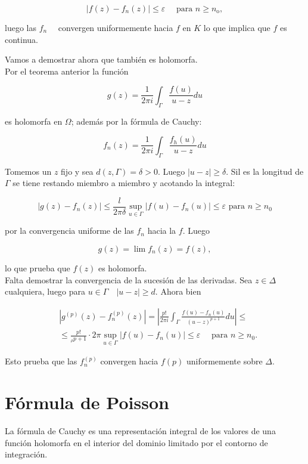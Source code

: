 \documentclass[10pt]{article}
\theoremstyle{plain}
\theoremstyle{definition}
\theoremstyle{remark}
\begin{document}
$$
\left|f(z)-f_{n}(z)\right| \leqslant \varepsilon \quad \text { para } n \geqslant n_{\mathrm{o}},
$$

luego las $f_{n} \quad$ convergen uniformemente hacia $f$ en $K$ lo que implica que $f$ es continua.

Vamos a demostrar ahora que también es holomorfa.\\
Por el teorema anterior la función

$$
g(z)=\frac{1}{2 \pi i} \int_{\Gamma} \frac{f(u)}{u-z} d u
$$

es holomorfa en $\Omega$; además por la fórmula de Cauchy:

$$
f_{n}(z)=\frac{1}{2 \pi i} \int_{\Gamma} \frac{f_{h}(u)}{u-z} d u
$$

Tomemos un $z$ fijo y sea $d(z, \Gamma)=\delta>0$. Luego $|u-z| \geqslant \delta$. Sil es la longitud de $\Gamma$ se tiene restando miembro a miembro y acotando la integral:

$$
\left|g(z)-f_{n}(z)\right| \leqslant \frac{l}{2 \pi \delta} \sup _{u \in \Gamma}\left|f(u)-f_{n}(u)\right| \leqslant \varepsilon \text { para } n \geqslant n_{0}
$$

por la convergencia uniforme de las $f_{n}$ hacia la $f$. Luego

$$
g(z)=\lim f_{n}(z)=f(z),
$$

lo que prueba que $f(z)$ es holomorfa.\\
Falta demostrar la convergencia de la sucesión de las derivadas. Sea $z \in \Delta$ cualquiera, luego para $u \in \Gamma \quad|u-z| \geqslant d$. Ahora bien

$$
\begin{aligned}
& \left|g^{(p)}(z)-f_{n}^{(p)}(z)\right|=\left|\frac{p!}{2 \pi i} \int_{\Gamma} \frac{f(u)-f_{n}(u)}{(u-z)^{p+1}} d u\right| \leqslant \\
& \leqslant \frac{p!}{{ }_{\rho} p+1} \cdot 2 \pi \sup _{u \in \Gamma}\left|f(u)-f_{n}(u)\right| \leqslant \varepsilon \quad \text { para } n \geqslant n_{0} .
\end{aligned}
$$

Esto prueba que las $f_{n}^{(p)}$ convergen hacia $f(p)$ uniformemente sobre $\Delta$.

\section{Fórmula de Poisson}
La fórmula de Cauchy es una representación integral de los valores de una función holomorfa en el interior del dominio limitado por el contorno de integración.
\end{document}
